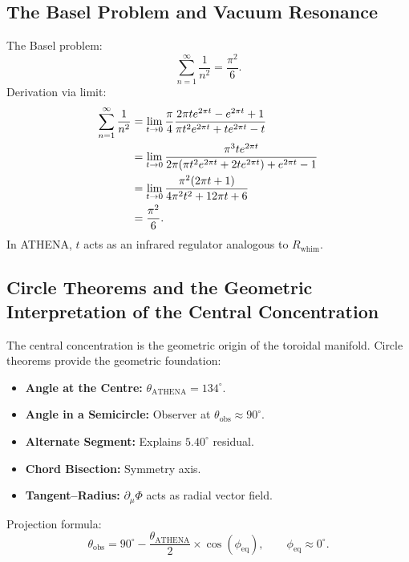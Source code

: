 \documentclass[12pt, a4paper]{article}
\begin{document}
\subsection{The Basel Problem and Vacuum Resonance}
\label{sec:basel}
The Basel problem:
\begin{equation}
\sum_{n=1}^{\infty} \frac{1}{n^2} = \frac{\pi^2}{6}.
\label{eq:basel}
\end{equation}
Derivation via limit:
\begin{align}
\sum_{n=1}^{\infty} \frac{1}{n^2} &= \lim_{t\to 0} \frac{\pi}{4} \frac{2\pi t e^{2\pi t} - e^{2\pi t} + 1}{\pi t^2 e^{2\pi t} + t e^{2\pi t} - t} \notag \\
&= \lim_{t\to 0} \frac{\pi^3 t e^{2\pi t}}{2\pi(\pi t^2 e^{2\pi t} + 2t e^{2\pi t}) + e^{2\pi t} - 1} \notag \\
&= \lim_{t\to 0} \frac{\pi^2(2\pi t + 1)}{4\pi^2 t^2 + 12\pi t + 6} \notag \\
&= \frac{\pi^2}{6}.
\label{eq:basel_derivation}
\end{align}
In ATHENA, $t$ acts as an infrared regulator analogous to $R_{\mathrm{whim}}$.

\subsection{Circle Theorems and the Geometric Interpretation of the Central Concentration}
\label{sec:circle_theorems}
The central concentration is the geometric origin of the toroidal manifold. Circle theorems provide the geometric foundation:
\begin{itemize}
    \item \textbf{Angle at the Centre:} $\theta_{\mathrm{ATHENA}} = 134^\circ$.
    \item \textbf{Angle in a Semicircle:} Observer at $\theta_{\mathrm{obs}} \approx 90^\circ$.
    \item \textbf{Alternate Segment:} Explains $5.40^\circ$ residual.
    \item \textbf{Chord Bisection:} Symmetry axis.
    \item \textbf{Tangent–Radius:} $\partial_\mu \Phi$ acts as radial vector field.
\end{itemize}
Projection formula:
\begin{equation}
\theta_{\mathrm{obs}} = 90^\circ - \frac{\theta_{\mathrm{ATHENA}}}{2} \times \cos(\phi_{\mathrm{eq}}), \qquad \phi_{\mathrm{eq}} \approx 0^\circ.
\label{eq:circle_projection}
\end{equation}
\end{document}
